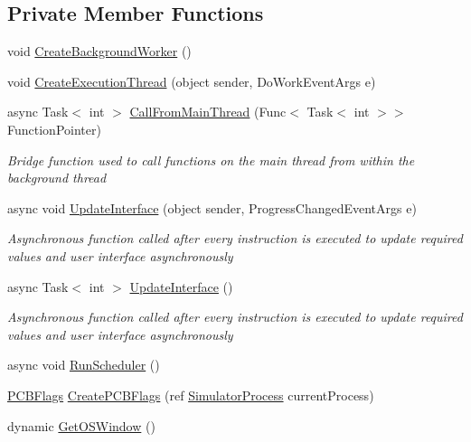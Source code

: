 \subsection*{Private Member Functions}
\begin{DoxyCompactItemize}
\item 
void \hyperlink{class_c_p_u___o_s___simulator_1_1_operating___system_1_1_scheduler_a5de68bce87efcb0d511d7e5a9bd4fe1f}{Create\+Background\+Worker} ()
\item 
void \hyperlink{class_c_p_u___o_s___simulator_1_1_operating___system_1_1_scheduler_a6b7d6ca2dc12aa2290263cc94aab7779}{Create\+Execution\+Thread} (object sender, Do\+Work\+Event\+Args e)
\item 
async Task$<$ int $>$ \hyperlink{class_c_p_u___o_s___simulator_1_1_operating___system_1_1_scheduler_a6b162741d7ccadc56da0e5a1b545efda}{Call\+From\+Main\+Thread} (Func$<$ Task$<$ int $>$$>$ Function\+Pointer)
\begin{DoxyCompactList}\small\item\em Bridge function used to call functions on the main thread from within the background thread \end{DoxyCompactList}\item 
async void \hyperlink{class_c_p_u___o_s___simulator_1_1_operating___system_1_1_scheduler_ac34fa53a93283545f0049794306e30a1}{Update\+Interface} (object sender, Progress\+Changed\+Event\+Args e)
\begin{DoxyCompactList}\small\item\em Asynchronous function called after every instruction is executed to update required values and user interface asynchronously \end{DoxyCompactList}\item 
async Task$<$ int $>$ \hyperlink{class_c_p_u___o_s___simulator_1_1_operating___system_1_1_scheduler_aa412769133cc4c67741cba7dd2381061}{Update\+Interface} ()
\begin{DoxyCompactList}\small\item\em Asynchronous function called after every instruction is executed to update required values and user interface asynchronously \end{DoxyCompactList}\item 
async void \hyperlink{class_c_p_u___o_s___simulator_1_1_operating___system_1_1_scheduler_a8981966e2ec66bf9684b0a7af88b45d4}{Run\+Scheduler} ()
\item 
\hyperlink{struct_c_p_u___o_s___simulator_1_1_operating___system_1_1_p_c_b_flags}{P\+C\+B\+Flags} \hyperlink{class_c_p_u___o_s___simulator_1_1_operating___system_1_1_scheduler_ad2cbb7bbe41e0eae42a68c3c691a4283}{Create\+P\+C\+B\+Flags} (ref \hyperlink{class_c_p_u___o_s___simulator_1_1_operating___system_1_1_simulator_process}{Simulator\+Process} current\+Process)
\item 
dynamic \hyperlink{class_c_p_u___o_s___simulator_1_1_operating___system_1_1_scheduler_abc2f3e3b3fe3881744a269575675d108}{Get\+O\+S\+Window} ()
\end{DoxyCompactItemize}
